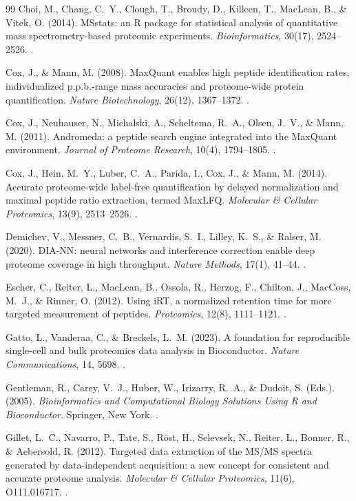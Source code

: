 \documentclass[11pt,oneside]{book}
\begin{document}
\begin{thebibliography}{99}
Choi, M., Chang, C.~Y., Clough, T., Broudy, D., Killeen, T., MacLean, B., \& Vitek, O. (2014). MSstats: an R package for statistical analysis of quantitative mass spectrometry-based proteomic experiments. \textit{Bioinformatics}, 30(17), 2524--2526. .

Cox, J., \& Mann, M. (2008). MaxQuant enables high peptide identification rates, individualized p.p.b.-range mass accuracies and proteome-wide protein quantification. \textit{Nature Biotechnology}, 26(12), 1367--1372. .

Cox, J., Neuhauser, N., Michalski, A., Scheltema, R.~A., Olsen, J.~V., \& Mann, M. (2011). Andromeda: a peptide search engine integrated into the MaxQuant environment. \textit{Journal of Proteome Research}, 10(4), 1794--1805. .

Cox, J., Hein, M.~Y., Luber, C.~A., Parida, I., Cox, J., \& Mann, M. (2014). Accurate proteome-wide label-free quantification by delayed normalization and maximal peptide ratio extraction, termed MaxLFQ. \textit{Molecular \& Cellular Proteomics}, 13(9), 2513--2526. .

Demichev, V., Messner, C.~B., Vernardis, S.~I., Lilley, K.~S., \& Ralser, M. (2020). DIA-NN: neural networks and interference correction enable deep proteome coverage in high throughput. \textit{Nature Methods}, 17(1), 41--44. .

Escher, C., Reiter, L., MacLean, B., Ossola, R., Herzog, F., Chilton, J., MacCoss, M.~J., \& Rinner, O. (2012). Using iRT, a normalized retention time for more targeted measurement of peptides. \textit{Proteomics}, 12(8), 1111--1121. .

Gatto, L., Vanderaa, C., \& Breckels, L.~M. (2023). A foundation for reproducible single-cell and bulk proteomics data analysis in Bioconductor. \textit{Nature Communications}, 14, 5698. .

Gentleman, R., Carey, V.~J., Huber, W., Irizarry, R.~A., \& Dudoit, S. (Eds.). (2005). \textit{Bioinformatics and Computational Biology Solutions Using R and Bioconductor}. Springer, New York. .

Gillet, L.~C., Navarro, P., Tate, S., R{\"o}st, H., Selevsek, N., Reiter, L., Bonner, R., \& Aebersold, R. (2012). Targeted data extraction of the MS/MS spectra generated by data-independent acquisition: a new concept for consistent and accurate proteome analysis. \textit{Molecular \& Cellular Proteomics}, 11(6), O111.016717. .


\end{thebibliography}
\end{document}
